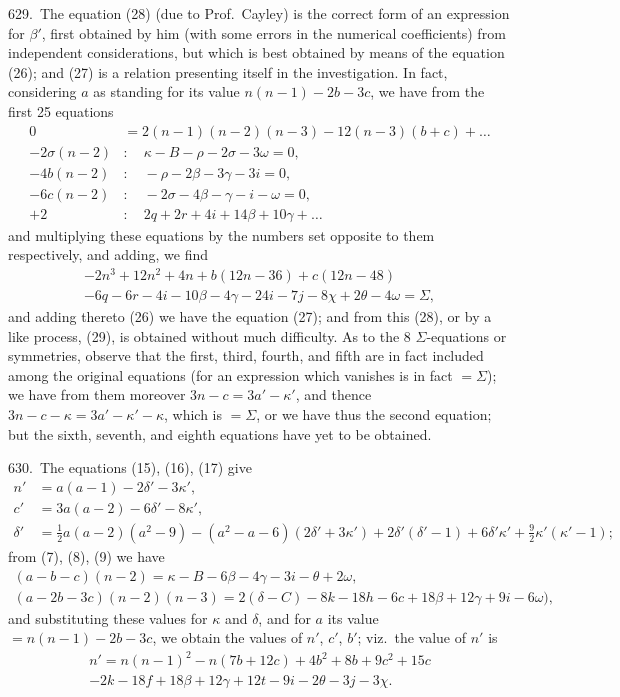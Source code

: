 \documentclass[11pt,a4paper]{article}
\theoremstyle{plain}
\theoremstyle{definition}
\theoremstyle{remark}
\begin{document}
629.\ The equation (28) (due to Prof.\ Cayley) is the correct form of an expression for $\beta'$, first obtained by him (with some errors in the numerical coefficients) from independent considerations, but which is best obtained by means of the equation (26); and (27) is a relation presenting itself in the investigation. In fact, considering $a$ as standing for its value $n(n-1)-2b-3c$, we have from the first 25 equations
\begin{align*}
0 &= 2(n-1)(n-2)(n-3)-12(n-3)(b+c)+\ldots\\
-2\sigma(n-2)&:\quad \kappa-B-\rho-2\sigma-3\omega=0,\\
-4b(n-2)&:\quad -\rho-2\beta-3\gamma-3i=0,\\
-6c(n-2)&:\quad -2\sigma-4\beta-\gamma-i-\omega=0,\\
+2&:\quad 2q+2r+4i+14\beta+10\gamma+\ldots
\end{align*}
and multiplying these equations by the numbers set opposite to them respectively, and adding, we find
\begin{multline*}
-2n^3+12n^2+4n+b(12n-36)+c(12n-48)\\
-6q-6r-4i-10\beta-4\gamma-24i-7j-8\chi+2\theta-4\omega=\Sigma,
\end{multline*}
and adding thereto (26) we have the equation (27); and from this (28), or by a like process, (29), is obtained without much difficulty. As to the 8 $\Sigma$-equations or symmetries, observe that the first, third, fourth, and fifth are in fact included among the original equations (for an expression which vanishes is in fact $=\Sigma$); we have from them moreover $3n-c=3a'-\kappa'$, and thence $3n-c-\kappa=3a'-\kappa'-\kappa$, which is $=\Sigma$, or we have thus the second equation; but the sixth, seventh, and eighth equations have yet to be obtained.

\newpage
\setcounter{page}{617}

630.\ The equations (15), (16), (17) give
\begin{align*}
n' &= a(a-1)-2\delta'-3\kappa',\\
c' &= 3a(a-2)-6\delta'-8\kappa',\\
\delta' &= \tfrac{1}{2}a(a-2)(a^2-9)-(a^2-a-6)(2\delta'+3\kappa')+2\delta'(\delta'-1)+6\delta'\kappa'+\tfrac{9}{2}\kappa'(\kappa'-1);
\end{align*}
from (7), (8), (9) we have
\begin{multline*}
(a-b-c)(n-2)=\kappa-B-6\beta-4\gamma-3i-\theta+2\omega,\\
(a-2b-3c)(n-2)(n-3)=2(\delta-C)-8k-18h-6c+18\beta+12\gamma+9i-6\omega),
\end{multline*}
and substituting these values for $\kappa$ and $\delta$, and for $a$ its value $=n(n-1)-2b-3c$, we obtain the values of $n'$, $c'$, $b'$; viz.\ the value of $n'$ is
\begin{multline*}
n'=n(n-1)^2-n(7b+12c)+4b^2+8b+9c^2+15c\\
-2k-18f+18\beta+12\gamma+12t-9i-2\theta-3j-3\chi.
\end{multline*}
\end{document}
